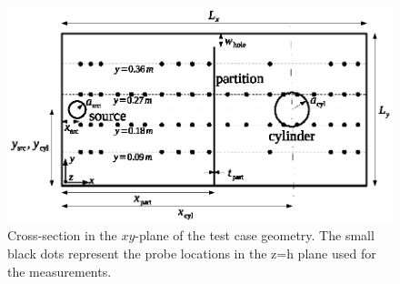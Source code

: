 \documentclass[a4paper]{article}
\numberwithin{equation}{section}
\begin{document}
\begin{figure}[ht]
\begin{center}
\includegraphics[width=0.8\linewidth]{figures/geometry}
\vspace{-4mm}
\caption{\label{fg:tcgeom} Cross-section in the $xy$-plane of the test case geometry.
The small black dots represent the probe locations in the z=h plane used for the measurements.}
\end{center}
\end{figure}
\end{document}
